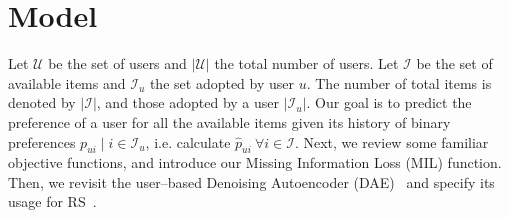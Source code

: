 \section{Model}\label{sec:model}
Let $\mathcal{U}$ be the set of users and $|\mathcal{U}|$ the total number of users. 
Let $\mathcal{I}$ be the set of available items and $\mathcal{I}_u$ the set adopted by user $u$. 
The number of total items is denoted by $|\mathcal{I}|$, and those adopted by a user $|\mathcal{I}_u|$.
Our goal is to predict the preference of a user for all the available items given its history of binary preferences $p_{ui} \mid i\in\mathcal{I}_u$, i.e. calculate $\hat{p}_{ui}~\forall i\in \mathcal{I}$.
Next, we review some familiar objective functions, and introduce our Missing Information Loss (MIL) function. Then, we revisit the user--based Denoising Autoencoder (DAE)~\cite{Kramer:1991:NLPCA, Vincent:2008:ECRF-AE} and specify its usage for RS~\cite{Sedhain:2015:Autorec, Wu:2016:CDAE-topN}.





%

%

% 


